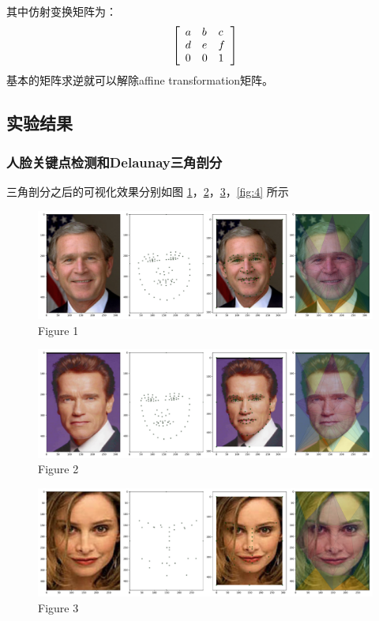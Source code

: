 \documentclass[a4paper]{article}
\begin{document}
其中仿射变换矩阵为：
$$
\left[ \begin{array} { l l l } { a } & { b } & { c } \\ { d } & { e } & { f } \\ { 0 } & { 0 } & { 1 } \end{array} \right]
$$
基本的矩阵求逆就可以解除affine transformation矩阵。

\subsection{实验结果}
\subsubsection{人脸关键点检测和Delaunay三角剖分}

三角剖分之后的可视化效果分别如图 \ref{fig:1}，\ref{fig:2}，\ref{fig:3}，\ref{fig:4} 所示


\begin{figure}[htp]
\centering
\includegraphics[width=1\linewidth]{pictures/1.pdf}
\caption{Figure 1}
\label{fig:1}
\end{figure}

\begin{figure}[htp]
\centering
\includegraphics[width=1\linewidth]{pictures/2.pdf}
\caption{Figure 2}
\label{fig:2}
\end{figure}

\begin{figure}[htp]
\centering
\includegraphics[width=1\linewidth]{pictures/3.pdf}
\caption{Figure 3}
\label{fig:3}
\end{figure}
\end{document}
